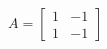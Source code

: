 \documentclass[preview]{standalone}
\begin{document}
\begin{center}
$\displaystyle A=\left[\begin{matrix}1 & -1\\1 & -1\end{matrix}\right]$
\end{center}
\end{document}
